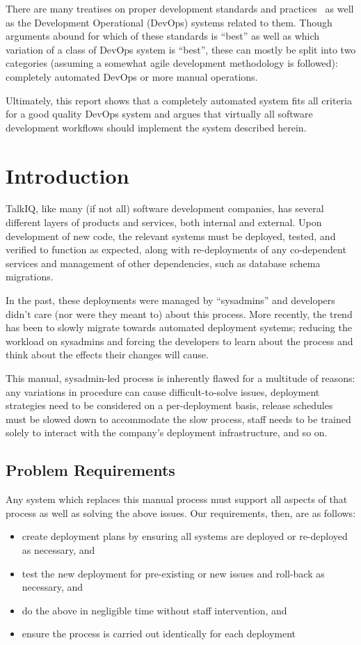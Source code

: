 \documentclass[12pt]{article}
\begin{document}
There are many treatises on proper development standards and practices~\cite{practices} as well as the Development Operational (DevOps) systems related to them. Though arguments abound for which of these standards is ``best'' as well as which variation of a class of DevOps system is ``best'', these can mostly be split into two categories (assuming a somewhat agile development methodology is followed): completely automated DevOps or more manual operations.

Ultimately, this report shows that a completely automated system fits all criteria for a good quality DevOps system and argues that virtually all software development workflows should implement the system described herein.
\newpage


\toc
\lot


\section{Introduction}
TalkIQ, like many (if not all) software development companies, has several different layers of products and services, both internal and external. Upon development of new code, the relevant systems must be deployed, tested, and verified to function as expected, along with re-deployments of any co-dependent services and management of other dependencies, such as database schema migrations.

In the past, these deployments were managed by ``sysadmins'' and developers didn't care (nor were they meant to) about this process. More recently, the trend has been to slowly migrate towards automated deployment systems; reducing the workload on sysadmins and forcing the developers to learn about the process and think about the effects their changes will cause.

This manual, sysadmin-led process is inherently flawed for a multitude of reasons: any variations in procedure can cause difficult-to-solve issues, deployment strategies need to be considered on a per-deployment basis, release schedules must be slowed down to accommodate the slow process, staff needs to be trained solely to interact with the company's deployment infrastructure, and so on.

\subsection{Problem Requirements}
Any system which replaces this manual process must support all aspects of that process as well as solving the above issues. Our requirements, then, are as follows:
\begin{itemize}
\item create deployment plans by ensuring all systems are deployed or re-deployed as necessary, and
\item test the new deployment for pre-existing or new issues and roll-back as necessary, and
\item do the above in negligible time without staff intervention, and
\item ensure the process is carried out identically for each deployment
\end{itemize}
\end{document}
